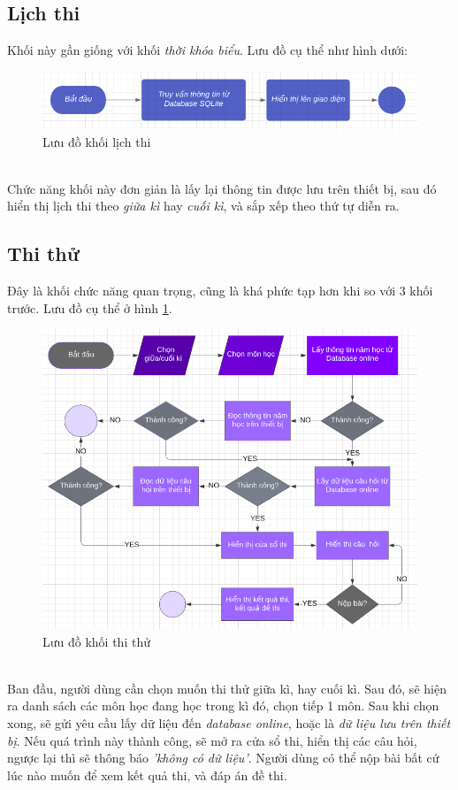 \documentclass[a4paper]{article}
\begin{document}
\subsection{Lịch thi}
\hspace*{.5 cm} Khối này gần giống với khối \textit{thời khóa biểu}. Lưu đồ cụ thể như hình dưới:
\begin{figure}[h!]
    \centering
    \includegraphics[scale=.4]{exam.png}
    \caption{Lưu đồ khối lịch thi}
\end{figure}\\
\hspace*{0.5 cm}Chức năng khối này đơn giản là lấy lại thông tin được lưu trên thiết bị, sau đó hiển thị lịch thi theo \textit{giữa kì} hay \textit{cuối kì}, và sắp xếp theo thứ tự diễn ra.
\subsection{Thi thử}
\hspace*{.5 cm} Đây là khối chức năng quan trọng, cũng là khá phức tạp hơn khi so với 3 khối trước. Lưu đồ cụ thể ở hình \ref{test}.
\begin{figure}[h!]
    \centering
    \includegraphics[scale=.4]{test.png}
    \caption{Lưu đồ khối thi thử}
    \label{test}
\end{figure}\\
\hspace*{0.5 cm}Ban đầu, người dùng cần chọn muốn thi thử giữa kì, hay cuối kì. Sau đó, sẽ hiện ra danh sách các môn học đang học trong kì đó, chọn tiếp 1 môn. Sau khi chọn xong, sẽ gửi yêu cầu lấy dữ liệu đến \textit{database online}, hoặc là \textit{dữ liệu lưu trên thiết bị}. Nếu quá trình này thành công, sẽ mở ra cửa sổ thi, hiển thị các câu hỏi, ngược lại thì sẽ thông báo \textit{'không có dữ liệu'}. Người dùng có thể nộp bài bất cứ lúc nào muốn để xem kết quả thi, và đáp án đề thi.
\end{document}
